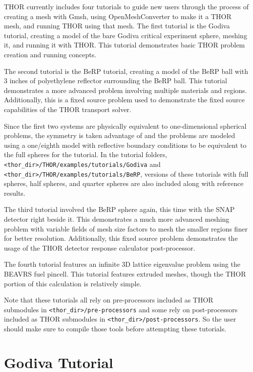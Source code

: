 \ac{THOR} currently includes four tutorials to guide new users through the process of creating a mesh with Gmsh, using OpenMeshConverter to make it a \ac{THOR} mesh, and running \ac{THOR} using that mesh.
The first tutorial is the Godiva tutorial, creating a model of the bare Godiva critical experiment sphere, meshing it, and running it with \ac{THOR}.
This tutorial demonstrates basic \ac{THOR} problem creation and running concepts.

The second tutorial is the BeRP tutorial, creating a model of the BeRP ball with 3 inches of polyethylene reflector surrounding the BeRP ball.
This tutorial demonstrates a more advanced problem involving multiple materials and regions.
Additionally, this is a fixed source problem used to demonstrate the fixed source capabilities of the THOR transport solver.

Since the first two systems are physically equivalent to one-dimensional spherical problems, the symmetry is taken advantage of and the problems are modeled using a one/eighth model with reflective boundary conditions to be equivalent to the full spheres for the tutorial.
In the tutorial folders, \\
\verb"<thor_dir>/THOR/examples/tutorials/Godiva" and \verb"<thor_dir>/THOR/examples/tutorials/BeRP", versions of these tutorials with full spheres, half spheres, and quarter spheres are also included along with reference results.

The third tutorial involved the BeRP sphere again, this time with the SNAP detector right beside it.
This demonstrates a much more advanced meshing problem with variable fields of mesh size factors to mesh the smaller regions finer for better resolution.
Additionally, this fixed source problem demonstrates the usage of the THOR detector response calculator post-processor.

The fourth tutorial features an infinite 3D lattice eigenvalue problem using the BEAVRS fuel pincell.
This tutorial features extruded meshes, though the THOR portion of this calculation is relatively simple.

Note that these tutorials all rely on pre-processors included as THOR submodules in \verb"<thor_dir>/pre-processors" and some rely on post-processors included as THOR submodules in \verb"<thor_dir>/post-processors".
So the user should make sure to compile those tools before attempting these tutorials.

\section{Godiva Tutorial}


